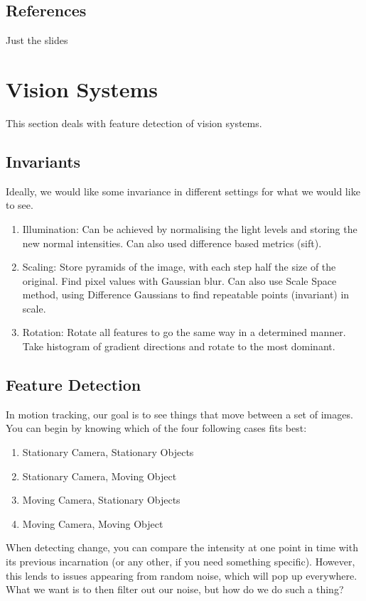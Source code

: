 \subsection{References}
Just the slides
\section{Vision Systems}
This section deals with feature detection of vision systems.
\subsection{Invariants}
Ideally, we would like some invariance in different settings for what we would like to see.
\begin{enumerate}
	\item Illumination: Can be achieved by normalising the light levels and storing the new normal intensities. Can also used difference based metrics (sift).
	\item Scaling: Store pyramids of the image, with each step half the size of the original. Find pixel values with Gaussian blur. Can also use Scale Space method, using Difference Gaussians to find repeatable points (invariant) in scale.
	\item Rotation: Rotate all features to go the same way in a determined manner. Take histogram of gradient directions and rotate to the most dominant.
\end{enumerate}
\subsection{Feature Detection}
In motion tracking, our goal is to see things that move between a set of images. You can begin by knowing which of the four following cases fits best:
\begin{enumerate}
	\item Stationary Camera, Stationary Objects
	\item Stationary Camera, Moving Object
	\item Moving Camera, Stationary Objects
	\item Moving Camera, Moving Object
\end{enumerate}
When detecting change, you can compare the intensity at one point in time with its previous incarnation (or any other, if you need something specific). However, this lends to issues appearing from random noise, which will pop up everywhere. What we want is to then filter out our noise, but how do we do such a thing?


